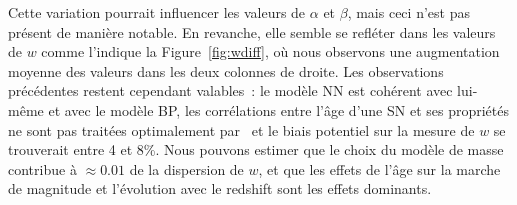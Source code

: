 \documentclass[../main/main.tex]{subfiles}
\begin{document}
Cette variation pourrait influencer les valeurs de $\alpha$ et $\beta$, mais
ceci n'est pas présent de manière notable. En revanche, elle semble se refléter
dans les valeurs de $w$ comme l'indique la Figure~\ref{fig:wdiff}, où nous
observons une augmentation moyenne des valeurs dans les deux colonnes de
droite. Les observations précédentes restent cependant valables~: le modèle NN
est cohérent avec lui-même et avec le modèle BP, les corrélations entre l'âge
d'une SN et ses propriétés ne sont pas traitées optimalement par \snana\ et le
biais potentiel sur la mesure de $w$ se trouverait entre 4 et 8\%. Nous pouvons
estimer que le choix du modèle de masse contribue à $\approx \num{0.01}$ de la
dispersion de $w$, et que les effets de l'âge sur la marche de magnitude et
l'évolution avec le redshift sont les effets dominants.
\end{document}
